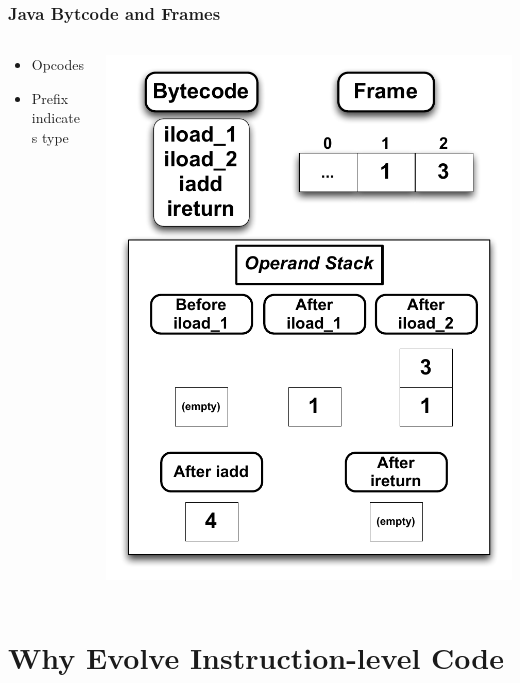 \documentclass{beamer}
\begin{document}
\begin{frame}
\frametitle{Java Bytcode and Frames}
\begin{columns}
\begin{column}{0.5\textwidth}
\begin{itemize}	
\item Opcodes
\item Prefix indicates type
\end{itemize}
\end{column}

\begin{column}{0.5\textwidth}
\includegraphics[height=.8\textheight]{Illustrations/stackBytecode.pdf}
\end{column}
\end{columns}
\end{frame}

\section[Why Instruction-level code]{Why Evolve Instruction-level Code}
\end{document}
